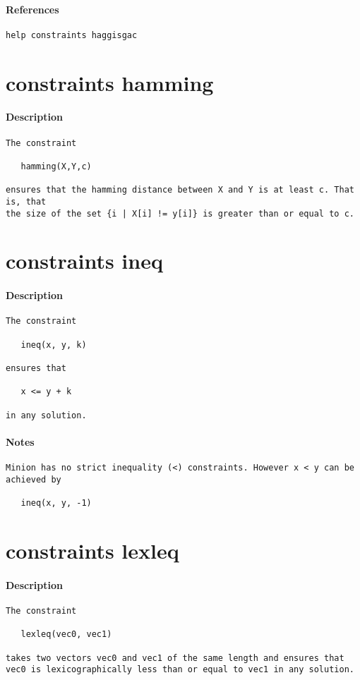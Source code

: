 \paragraph{References}
{\footnotesize
\begin{verbatim}
help constraints haggisgac
\end{verbatim}
}
\section{constraints hamming}
\paragraph{Description}
{\footnotesize
\begin{verbatim}
The constraint

   hamming(X,Y,c)

ensures that the hamming distance between X and Y is at least c. That is, that
the size of the set {i | X[i] != y[i]} is greater than or equal to c.
\end{verbatim}
}
\section{constraints ineq}
\paragraph{Description}
{\footnotesize
\begin{verbatim}
The constraint

   ineq(x, y, k)

ensures that

   x <= y + k

in any solution.
\end{verbatim}
}
\paragraph{Notes}
{\footnotesize
\begin{verbatim}
Minion has no strict inequality (<) constraints. However x < y can be
achieved by

   ineq(x, y, -1)
\end{verbatim}
}
\section{constraints lexleq}
\paragraph{Description}
{\footnotesize
\begin{verbatim}
The constraint

   lexleq(vec0, vec1)

takes two vectors vec0 and vec1 of the same length and ensures that
vec0 is lexicographically less than or equal to vec1 in any solution.
\end{verbatim}
}
